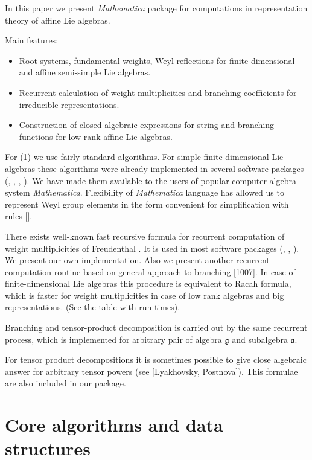 \documentclass[12pt]{article}
\theoremstyle{definition}
\newcommand{\gf}{\mathfrak{g}}
\newcommand{\af}{\mathfrak{a}}
\begin{document}
In this paper we present {\it Mathematica} package for computations in representation theory of affine Lie algebras. 

Main features:
\begin{itemize}
\item Root systems, fundamental weights, Weyl reflections for finite dimensional and affine semi-simple Lie algebras.
\item Recurrent calculation of weight multiplicities and branching coefficients for irreducible representations.
\item Construction of closed algebraic expressions for string and branching functions for low-rank affine Lie algebras.
\end{itemize}

For (1) we use fairly standard algorithms. For simple finite-dimensional Lie algebras these algorithms were already implemented in several software packages (\cite{vanleeuwen1994lsp}, \cite{stembridge2001computational}, \cite{fischbacher2002ilp}, \cite{simplie}). We have made them available to the users of popular computer algebra system {\it Mathematica}. Flexibility of {\it Mathematica} language has allowed us to represent Weyl group elements in the form convenient for simplification with rules []. 

There exists well-known fast recursive formula for recurrent computation of weight multiplicities of Freudenthal \cite{moody1982fast}. It is used in most software packages (\cite{vanleeuwen1994lsp}, \cite{stembridge2001computational}, \cite{fischbacher2002ilp}). We present our own implementation. Also we present another recurrent computation routine based on general approach to branching [1007]. In case of finite-dimensional Lie algebras this procedure is equivalent to Racah formula, which is faster for weight multiplicities in case of low rank algebras and big representations. (See the table with run times). 

Branching and tensor-product decomposition is carried out by the same recurrent process, which is implemented for arbitrary pair of algebra $\gf$ and subalgebra $\af$. 

For tensor product decompositions it is sometimes possible to give close algebraic answer for arbitrary tensor powers (see [Lyakhovsky, Postnova]). This formulae are also included in our package.

\section{Core algorithms and data structures}
\label{sec:core-algorithms}
\end{document}
